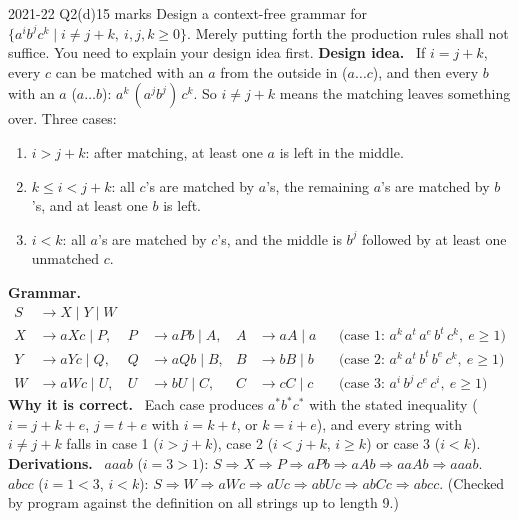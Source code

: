 \documentclass[10.5pt,a4paper]{article}
\newcommand{\ansh}[1]{\textbf{\color{exborder}#1}\ }
\begin{document}
\begin{examq}{2021-22 Q2(d)}{15 marks}
Design a context-free grammar for $\{a^ib^jc^k\mid i\ne j+k,\ i,j,k\ge0\}$. Merely putting forth the production rules shall not suffice. You need
to explain your design idea first.
\tcblower
\ansh{Design idea.} If $i=j+k$, every $c$ can be matched with an $a$ from the outside in ($a\dots c$), and then every $b$ with an $a$
($a\dots b$): $a^k\,(a^jb^j)\,c^k$. So $i\ne j+k$ means the matching leaves something over. Three cases:
\begin{enumerate}
\item $i>j+k$: after matching, at least one $a$ is left in the middle.
\item $k\le i<j+k$: all $c$'s are matched by $a$'s, the remaining $a$'s are matched by $b$'s, and at least one $b$ is left.
\item $i<k$: all $a$'s are matched by $c$'s, and the middle is $b^j$ followed by at least one unmatched $c$.
\end{enumerate}
\ansh{Grammar.}
\[\begin{aligned}
S&\to X\mid Y\mid W\\
X&\to aXc\mid P, & P&\to aPb\mid A, & A&\to aA\mid a &&\text{(case 1: } a^k\,a^t\,a^{e}\,b^t\,c^k,\ e\ge1)\\
Y&\to aYc\mid Q, & Q&\to aQb\mid B, & B&\to bB\mid b &&\text{(case 2: } a^k\,a^t\,b^t\,b^{e}\,c^k,\ e\ge1)\\
W&\to aWc\mid U, & U&\to bU\mid C, & C&\to cC\mid c &&\text{(case 3: } a^i\,b^j\,c^{e}\,c^i,\ e\ge1)
\end{aligned}\]
\ansh{Why it is correct.} Each case produces $a^*b^*c^*$ with the stated inequality ($i=j+k+e$, $j=t+e$ with $i=k+t$, or $k=i+e$), and every
string with $i\ne j+k$ falls in case 1 ($i>j+k$), case 2 ($i<j+k$, $i\ge k$) or case 3 ($i<k$).\\
\ansh{Derivations.} $aaab$ ($i=3>1$): $S\Rightarrow X\Rightarrow P\Rightarrow aPb\Rightarrow aAb\Rightarrow aaAb\Rightarrow aaab$.
$abcc$ ($i=1<3$, $i<k$): $S\Rightarrow W\Rightarrow aWc\Rightarrow aUc\Rightarrow abUc\Rightarrow abCc\Rightarrow abcc$.
(Checked by program against the definition on all strings up to length 9.)
\end{examq}
\end{document}
